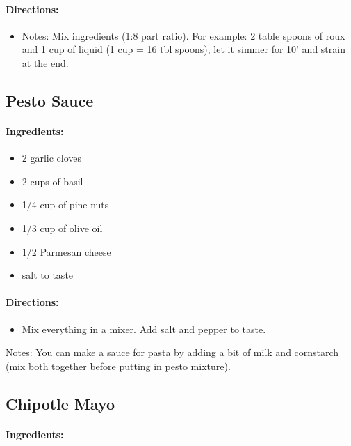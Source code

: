 \documentclass{article}
\begin{document}
\paragraph{Directions:}
\begin{itemize}
	\item Notes: Mix ingredients (1:8 part ratio). For example: 2 table spoons of roux and 1 cup of liquid (1 cup = 16 tbl spoons), let it simmer for 10' and strain at the end.
\end{itemize}


\subsection{Pesto Sauce}

\paragraph{Ingredients:}

\begin{itemize}
	\item 2 garlic cloves
	\item 2 cups of basil
	\item 1/4 cup of pine nuts
	\item 1/3 cup of olive oil
	\item 1/2 Parmesan cheese
	\item salt to taste
\end{itemize}

\paragraph{Directions:}
\begin{itemize}
	\item Mix everything in a mixer. Add salt and pepper to taste.
\end{itemize}

Notes: You can make a sauce for pasta by adding a bit of milk and cornstarch (mix both together before putting in pesto mixture).

\subsection{Chipotle Mayo}

\paragraph{Ingredients:}
\end{document}
